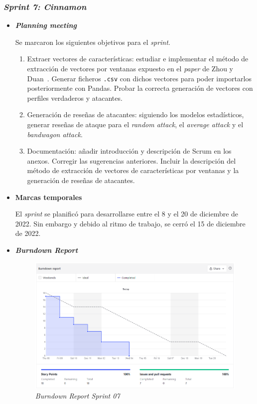\subsubsection{\textit{Sprint 7: Cinnamon }}
\begin{itemize}
	\item \textbf{\textit{Planning meeting}}
	
	Se marcaron los siguientes objetivos para el \textit{sprint}.
	
	\begin{enumerate}
		\item Extraer vectores de características: estudiar e implementar el método de extracción de vectores por ventanas expuesto en el \textit{paper} de Zhou y Duan~\cite{zhou2021SemisupervisedRecommendationAttack}. Generar ficheros \texttt{.csv} con dichos vectores para poder importarlos posteriormente con Pandas. Probar la correcta generación de vectores con perfiles verdaderos y atacantes.
		\item Generación de reseñas de atacantes: siguiendo los modelos estadísticos, generar reseñas de ataque para el \textit{random attack}, el \textit{average attack} y el \textit{bandwagon attack}.
		\item Documentación: añadir introducción y descripción de Scrum en los anexos. Corregir las sugerencias anteriores. Incluir la descripción del método de extracción de vectores de características por ventanas y la generación de reseñas de atacantes.
	\end{enumerate}
	
	\item \textbf{Marcas temporales}		
	
	El \textit{sprint} se planificó para desarrollarse entre el 8 y el 20 de diciembre de 2022. Sin embargo y debido al ritmo de trabajo, se cerró el 15 de diciembre de 2022.
	
	\item \textbf{\textit{Burndown Report}}
	\begin{figure}[h]
		\caption[\textit{Sprint} 07: \textit{burndown report}]{\textit{Burndown Report Sprint 07}}
		\centering
		\includegraphics[width=\textwidth]{../img/anexos/bdr/s07_bdr}
	\end{figure}


\end{itemize}
